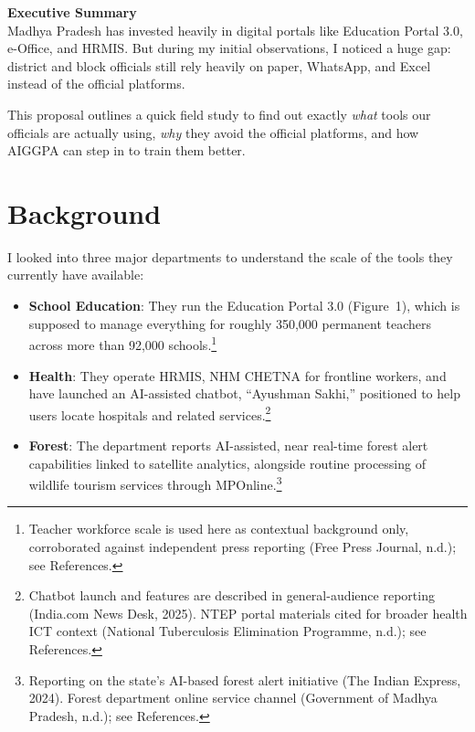 \documentclass[11pt,a4paper]{article}
\begin{document}
\newpage

\begin{goldbox}
  \textbf{\color{navyblue}\large Executive Summary}\\[6pt]
  Madhya Pradesh has invested heavily in digital portals like Education Portal 3.0, e-Office, and HRMIS. But during my initial observations, I noticed a huge gap: district and block officials still rely heavily on paper, WhatsApp, and Excel instead of the official platforms. 
  
  This proposal outlines a quick field study to find out exactly \textit{what} tools our officials are actually using, \textit{why} they avoid the official platforms, and how AIGGPA can step in to train them better.
\end{goldbox}

\vspace{0.4cm}

\section{Background}

\vspace{0.2cm}
I looked into three major departments to understand the scale of the tools they currently have available:
\begin{itemize}[leftmargin=1.4em]
  \item \textbf{School Education}: They run the Education Portal 3.0 (Figure~1), which is supposed to manage everything for roughly 350,000 permanent teachers across more than 92,000 schools.\footnote{Teacher workforce scale is used here as contextual background only, corroborated against independent press reporting (Free Press Journal, n.d.); see References.}
  \item \textbf{Health}: They operate HRMIS, NHM CHETNA for frontline workers, and have launched an AI-assisted chatbot, ``Ayushman Sakhi,'' positioned to help users locate hospitals and related services.\footnote{Chatbot launch and features are described in general-audience reporting (India.com News Desk, 2025). NTEP portal materials cited for broader health ICT context (National Tuberculosis Elimination Programme, n.d.); see References.}
  \item \textbf{Forest}: The department reports AI-assisted, near real-time forest alert capabilities linked to satellite analytics, alongside routine processing of wildlife tourism services through MPOnline.\footnote{Reporting on the state's AI-based forest alert initiative (The Indian Express, 2024). Forest department online service channel (Government of Madhya Pradesh, n.d.); see References.}
\end{itemize}
\end{document}
